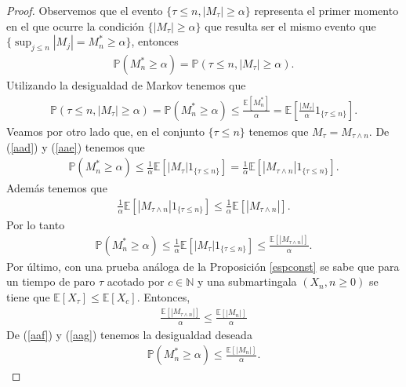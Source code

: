 \begin{proof}
	Observemos que el evento $\{ \tau \leq n, |M_{\tau}| \geq \alpha\}$ representa el primer momento en el que ocurre la condición $\{|M_{\tau}| \geq \alpha\}$ que resulta ser el mismo evento que $\{\sup_{j \leq n} |M_j| = M_n^{*} \geq \alpha\}$, entonces
	\begin{align}
		\mathbb{P}(M_n^{*} \geq \alpha) = \mathbb{P}(\tau \leq n, |M_{\tau}| \geq \alpha). \label{aad}
	\end{align}
Utilizando la desigualdad de Markov tenemos que 
	\begin{align}
		\mathbb{P}(\tau \leq n, |M_{\tau}| \geq \alpha) = \mathbb{P}(M_n^{*} \geq \alpha)  \leq \frac{\mathbb{E}[M_n^{*}]}{\alpha} = \mathbb{E} \left[\frac{|M_{\tau}|}{\alpha}  1_{\{\tau \leq n\}} \right]. \label{aae}
	\end{align}
Veamos por otro lado que, en el conjunto $\{ \tau \leq n\}$ tenemos que $M_{\tau} = M_{\tau \wedge n}$. De (\ref{aad}) y (\ref{aae}) tenemos que
	\begin{align*}
		\mathbb{P}(M_n^{*} \geq \alpha) \leq \frac{1}{\alpha} \mathbb{E}[|M_{\tau}|  1_{\{\tau \leq n\}}] = \frac{1}{\alpha} \mathbb{E}[|M_{\tau \wedge n}|  1_{\{\tau \leq n\}}].
	\end{align*}
Además tenemos que 
	\begin{align*}
		\frac{1}{\alpha} \mathbb{E}[|M_{\tau \wedge n}|  1_{\{\tau \leq n\}}] \leq \frac{1}{\alpha} \mathbb{E}[|M_{\tau \wedge n}|].
	\end{align*}
Por lo tanto
	\begin{align}
		\mathbb{P}(M_n^{*} \geq \alpha) \leq \frac{1}{\alpha} \mathbb{E}[|M_{\tau}|  1_{\{\tau \leq n\}}] \leq \frac{\mathbb{E}[|M_{\tau \wedge n}|]}{\alpha}. \label{aaf}
	\end{align}
	Por último, con una prueba análoga de la Proposición \ref{espconst} se sabe que para un tiempo de paro $\tau$ acotado por $c \in \mathbb{N}$ y una submartingala $(X_n, n \geq 0)$ se tiene que $\mathbb{E}[X_{\tau}] \leq \mathbb{E}[X_{c}]$. Entonces, 
	\begin{align}
		\frac{\mathbb{E}[|M_{\tau \wedge n}|]}{\alpha} \leq \frac{\mathbb{E}[|M_{n}|]}{\alpha} \label{aag}
	\end{align}
	De (\ref{aaf}) y (\ref{aag}) tenemos la desigualdad deseada
	\begin{align*}
		\mathbb{P}(M_n^{*} \geq \alpha) \leq \frac{\mathbb{E}[|M_{n}|]}{\alpha}.
	\end{align*}
\end{proof}

